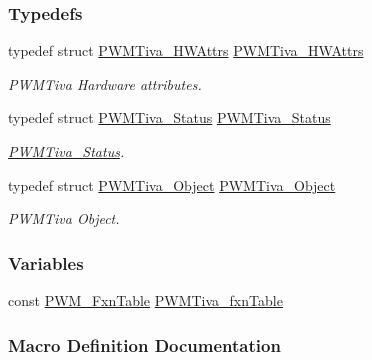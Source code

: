\subsubsection*{Typedefs}
\begin{DoxyCompactItemize}
\item 
typedef struct \hyperlink{struct_p_w_m_tiva___h_w_attrs}{P\+W\+M\+Tiva\+\_\+\+H\+W\+Attrs} \hyperlink{_p_w_m_tiva_8h_a9dc35e1e545e80c16d6ac60c101e2143}{P\+W\+M\+Tiva\+\_\+\+H\+W\+Attrs}
\begin{DoxyCompactList}\small\item\em P\+W\+M\+Tiva Hardware attributes. \end{DoxyCompactList}\item 
typedef struct \hyperlink{struct_p_w_m_tiva___status}{P\+W\+M\+Tiva\+\_\+\+Status} \hyperlink{_p_w_m_tiva_8h_a76a48f3f7fa2bec8b163b5dc1e5301ee}{P\+W\+M\+Tiva\+\_\+\+Status}
\begin{DoxyCompactList}\small\item\em \hyperlink{struct_p_w_m_tiva___status}{P\+W\+M\+Tiva\+\_\+\+Status}. \end{DoxyCompactList}\item 
typedef struct \hyperlink{struct_p_w_m_tiva___object}{P\+W\+M\+Tiva\+\_\+\+Object} \hyperlink{_p_w_m_tiva_8h_a6a177b361dfd0da20d6fa735b680b5c5}{P\+W\+M\+Tiva\+\_\+\+Object}
\begin{DoxyCompactList}\small\item\em P\+W\+M\+Tiva Object. \end{DoxyCompactList}\end{DoxyCompactItemize}
\subsubsection*{Variables}
\begin{DoxyCompactItemize}
\item 
const \hyperlink{struct_p_w_m___fxn_table}{P\+W\+M\+\_\+\+Fxn\+Table} \hyperlink{_p_w_m_tiva_8h_ae9b8f538f1e9e857629220104addd24a}{P\+W\+M\+Tiva\+\_\+fxn\+Table}
\end{DoxyCompactItemize}


\subsubsection{Macro Definition Documentation}
